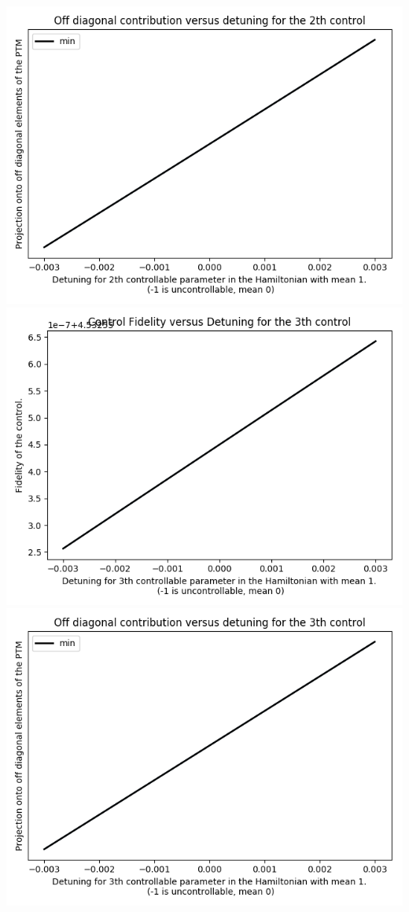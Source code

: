\documentclass{article}
\begin{document}
\begin{center}
\includegraphics[scale=.9]{off_diag_3}
\includegraphics[scale=.9]{control_fid_4}
\includegraphics[scale=.9]{off_diag_4}

\end{center}
\end{document}
